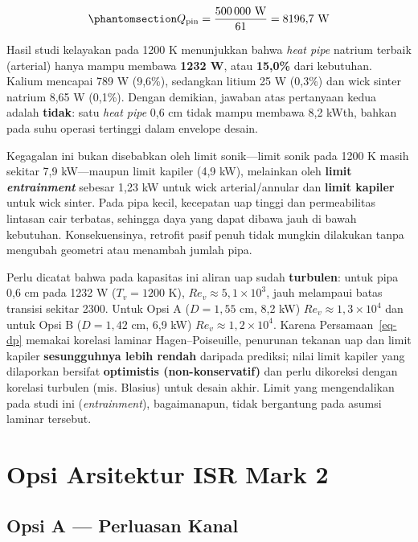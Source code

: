 \documentclass[
  indonesian,
  12pt,
  a4paper,
]{report}
\begin{document}
\begin{equation}\protect\phantomsection\label{eq-qpin}{ Q_{\mathrm{pin}} = \frac{500\,000\ \mathrm{W}}{61} = 8196{,}7\ \mathrm{W}
   }\end{equation}

Hasil studi kelayakan pada 1200 K menunjukkan bahwa \emph{heat pipe}
natrium terbaik (arterial) hanya mampu membawa \textbf{1232 W}, atau
\textbf{15,0\%} dari kebutuhan. Kalium mencapai 789 W (9,6\%), sedangkan
litium 25 W (0,3\%) dan wick sinter natrium 8,65 W (0,1\%). Dengan
demikian, jawaban atas pertanyaan kedua adalah \textbf{tidak}: satu
\emph{heat pipe} 0,6 cm tidak mampu membawa 8,2 kWth, bahkan pada suhu
operasi tertinggi dalam envelope desain.

Kegagalan ini bukan disebabkan oleh limit sonik---limit sonik pada 1200
K masih sekitar 7,9 kW---maupun limit kapiler (4,9 kW), melainkan oleh
\textbf{limit \emph{entrainment}} sebesar 1,23 kW untuk wick
arterial/annular dan \textbf{limit kapiler} untuk wick sinter. Pada pipa
kecil, kecepatan uap tinggi dan permeabilitas lintasan cair terbatas,
sehingga daya yang dapat dibawa jauh di bawah kebutuhan. Konsekuensinya,
retrofit pasif penuh tidak mungkin dilakukan tanpa mengubah geometri
atau menambah jumlah pipa.

Perlu dicatat bahwa pada kapasitas ini aliran uap sudah
\textbf{turbulen}: untuk pipa 0,6 cm pada 1232 W (\(T_v=1200\) K),
\(Re_v\approx5{,}1\times10^3\), jauh melampaui batas transisi sekitar
2300. Untuk Opsi A (\(D=1{,}55\) cm, 8,2 kW)
\(Re_v\approx1{,}3\times10^4\) dan untuk Opsi B (\(D=1{,}42\) cm, 6,9
kW) \(Re_v\approx1{,}2\times10^4\). Karena Persamaan~\ref{eq-dp} memakai
korelasi laminar Hagen--Poiseuille, penurunan tekanan uap dan limit
kapiler \textbf{sesungguhnya lebih rendah} daripada prediksi; nilai
limit kapiler yang dilaporkan bersifat \textbf{optimistis
(non-konservatif)} dan perlu dikoreksi dengan korelasi turbulen (mis.
Blasius) untuk desain akhir. Limit yang mengendalikan pada studi ini
(\emph{entrainment}), bagaimanapun, tidak bergantung pada asumsi laminar
tersebut.

\section{Opsi Arsitektur ISR Mark 2}\label{opsi-arsitektur-isr-mark-2}

\subsection{Opsi A --- Perluasan Kanal}\label{opsi-a-perluasan-kanal}
\end{document}
